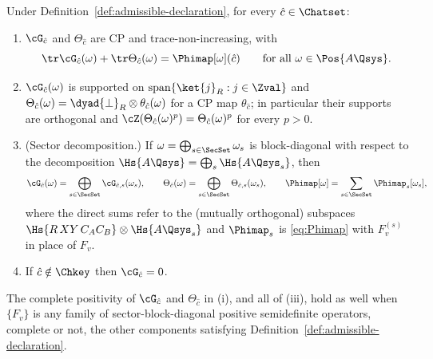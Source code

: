 
\begin{lemma}\label{lem:branch-maps}
Under Definition~\ref{def:admissible-declaration}, for every $\hat c\in\Chatset$:
\begin{enumerate}[label=(\roman*),leftmargin=2.2em]
\item $\cG_{\hat c}$ and $\Theta_{\hat c}$ are CP and trace-non-increasing,
with
\begin{equation}\label{eq:traces}
  \tr\cG_{\hat c}(\omega)+\tr\Theta_{\hat c}(\omega)
  =\Phimap[\omega](\hat c)
  \qquad\text{for all }\omega\in\Pos{A\Qsys}.
\end{equation}
\item $\cG_{\hat c}(\omega)$ is supported on
$\operatorname{span}\{\ket{j}_R:j\in\Zval\}$ and
$\Theta_{\hat c}(\omega)=\dyad{\perp}_{R}\otimes\theta_{\hat c}(\omega)$ for
a CP map $\theta_{\hat c}$; in particular their supports are orthogonal and
$\cZ(\Theta_{\hat c}(\omega)^{p})=\Theta_{\hat c}(\omega)^{p}$ for every
$p>0$.
\item (Sector decomposition.) If
$\omega=\bigoplus_{s\in\SecSet}\omega_s$ is block-diagonal with respect to
the decomposition $\Hs{A\Qsys}=\bigoplus_s\Hs{A\Qsys_s}$, then
\begin{equation}\label{eq:G-sector}
  \cG_{\hat c}(\omega)=\bigoplus_{s\in\SecSet}\cG_{\hat c,s}(\omega_s),
  \qquad
  \Theta_{\hat c}(\omega)=\bigoplus_{s\in\SecSet}\Theta_{\hat c,s}(\omega_s),
  \qquad
  \Phimap[\omega]=\sum_{s\in\SecSet}\Phimap_s[\omega_s],
\end{equation}
where the direct sums refer to the (mutually orthogonal) subspaces
$\Hs{R\,XY\,C_AC_B}\otimes\Hs{A\Qsys_s}$ and
$\Phimap_s$ is \eqref{eq:Phimap} with $F_v^{(s)}$ in place of $F_v$.
\item If $\hat c\notin\Chkey$ then $\cG_{\hat c}=0$.
\end{enumerate}
The complete positivity of $\cG_{\hat c}$ and $\Theta_{\hat c}$ in (i),
and all of (iii), hold as well when $\{F_v\}$ is any family of
sector-block-diagonal positive semidefinite operators, complete or not,
the other components satisfying Definition~\ref{def:admissible-declaration}.
\end{lemma}

